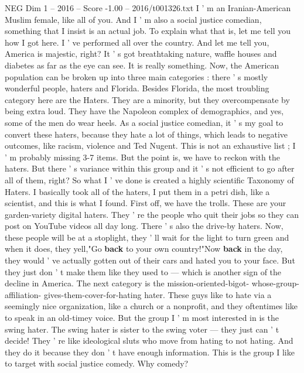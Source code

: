 \begin{textsample}{NEG Dim 1 – 2016 – Score -1.00 – 2016/t001326.txt}  \label{ex:f1_neg_030}
I ' m an Iranian-American Muslim female, like all of you.
And I ' m also a social justice comedian, something that I insist is an actual job.
To explain what that is, let me tell you how I got here.
I ' ve performed all over the country.
And let me tell you, America is majestic, right?
It ' s got breathtaking nature, waffle houses and diabetes as far as the eye can see.
It is really something.
Now, the American population can be broken up into three main categories : there ' s mostly wonderful people, haters and Florida.
Besides Florida, the most troubling category here are the Haters.
They are a minority, but they overcompensate by being extra loud.
They have the Napoleon complex of demographics, and yes, some of the men do wear heels.
As a social justice comedian, it ' s my goal to convert these haters, because they hate a lot of things, which leads to negative outcomes, like racism, violence and Ted Nugent.
This is not an exhaustive list ; I ' m probably missing 3-7 items.
But the point is, we have to reckon with the haters.
But there ' s variance within this group and it ' s not efficient to go after all of them, right?
So what I ' ve done is created a highly scientific Taxonomy of Haters.
I basically took all of the haters, I put them in a petri dish, like a scientist, and this is what I found.
First off, we have the trolls.
These are your garden-variety digital haters.
They ' re the people who quit their jobs so they can post on YouTube videos all day long.
There ' s also the drive-by haters.
Now, these people will be at a stoplight, they ' ll wait for the light to turn green and when it does, they yell,"Go \textbf{back} to your own country!"Now \textbf{back} in the day, they would ' ve actually gotten out of their cars and hated you to your face.
But they just don ' t make them like they used to — which is another sign of the decline in America.
The next category is the mission-oriented-bigot- whose-group-affiliation- gives-them-cover-for-hating hater.
These guys like to hate via a seemingly nice organization, like a church or a nonprofit, and they oftentimes like to speak in an old-timey voice.
But the group I ' m most interested in is the swing hater.
The swing hater is sister to the swing voter — they just can ' t decide!
They ' re like ideological sluts who move from hating to not hating.
And they do it because they don ' t have enough information.
This is the group I like to target with social justice comedy.
Why comedy?

\end{textsample}
